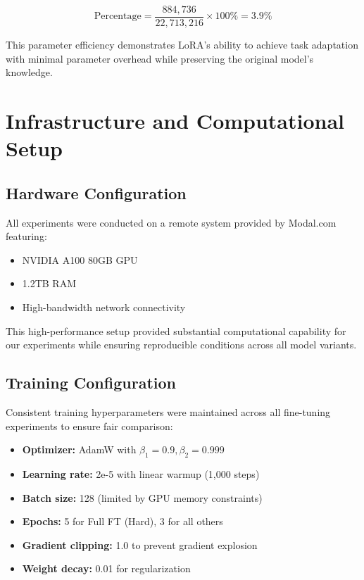 \begin{equation}
\text{Percentage} = \frac{884,736}{22,713,216} \times 100\% = 3.9\%
\end{equation}

This parameter efficiency demonstrates LoRA's ability to achieve task adaptation with minimal parameter overhead while preserving the original model's knowledge.

\section{Infrastructure and Computational Setup}

\subsection{Hardware Configuration}

All experiments were conducted on a remote system provided by Modal.com featuring:
\begin{itemize}
\item NVIDIA A100 80GB GPU
\item 1.2TB RAM
\item High-bandwidth network connectivity
\end{itemize}

This high-performance setup provided substantial computational capability for our experiments while ensuring reproducible conditions across all model variants.

\subsection{Training Configuration}

Consistent training hyperparameters were maintained across all fine-tuning experiments to ensure fair comparison:

\begin{itemize}
\item \textbf{Optimizer:} AdamW with $\beta_1=0.9, \beta_2=0.999$
\item \textbf{Learning rate:} 2e-5 with linear warmup (1,000 steps)
\item \textbf{Batch size:} 128 (limited by GPU memory constraints)
\item \textbf{Epochs:} 5 for Full FT (Hard), 3 for all others
\item \textbf{Gradient clipping:} 1.0 to prevent gradient explosion
\item \textbf{Weight decay:} 0.01 for regularization
\end{itemize}


